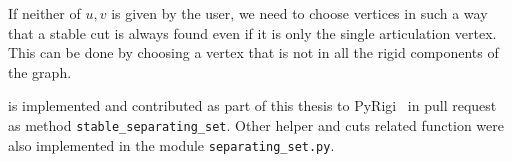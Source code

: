 If neither of \( u, v \) is given by the user,
we need to choose vertices in such a way
that a stable cut is always found even if it is only the single articulation vertex.
This can be done by choosing a vertex that is not in all the rigid components of the graph.

%
is implemented and contributed as part of this thesis
to PyRigi~\cite{pyrigi} in pull request~\cite{pyrigi_pr_stable_cuts}
as method \texttt{stable\_separating\_set}.
Other helper and cuts related function
were also implemented in the module \texttt{separating\_set.py}.

